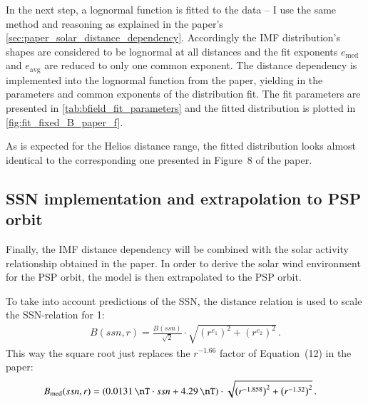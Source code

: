 In the next step, a lognormal function is fitted to the data -- I use the same method and reasoning as explained in the paper's \autoref{sec:paper_solar_distance_dependency}. Accordingly the IMF distribution's shapes are considered to be lognormal at all distances and the fit exponents $e_\text{med}$ and $e_\text{avg}$ are reduced to only one common exponent. The distance dependency is implemented into the lognormal function from the paper, yielding in the parameters and common exponents of the distribution fit. The fit parameters are presented in \autoref{tab:bfield_fit_parameters} and the fitted distribution is plotted in \autoref{fig:fit_fixed_B_paper_f}.
\begin{figure}[htb]
\end{figure}
As is expected for the Helios distance range, the fitted distribution looks almost identical to the corresponding one presented in Figure~8 of the paper.

\subsection{SSN implementation and extrapolation to PSP orbit}
Finally, the IMF distance dependency will be combined with the solar activity relationship obtained in the paper. In order to derive the solar wind environment for the PSP orbit, the model is then extrapolated to the PSP orbit.

To take into account predictions of the SSN, the distance relation is used to scale the SSN-relation for \SI{1}{\au}:
\begin{align}
	B(ssn,r) = \frac{B(ssn)}{\sqrt{2}} \cdot \sqrt{\left(r^{e_1}\right)^2 + \left(r^{e_2}\right)^2}	\,.
\end{align}
This way the square root just replaces the $r^{-1.66}$ factor of Equation~(12) in the paper:
\begin{align}
	B_\text{med}(ssn,r) &= \left(\SI{0.0131}{\nT} \cdot ssn + \SI{4.29}{\nT}\right) \cdot \sqrt{\left(r^{-1.858}\right)^2 + \left(r^{-1.32}\right)^2}	\,.
\end{align}

